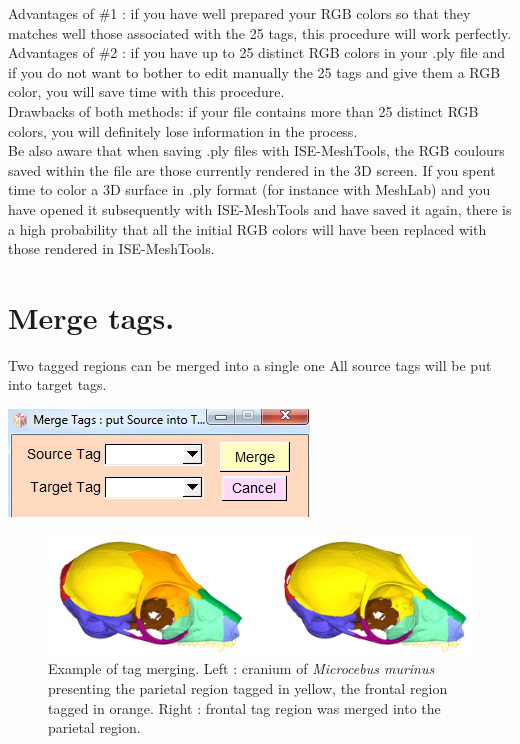Advantages of \#1 : if you have well prepared your RGB colors so that they matches well those associated with the 25 tags, this procedure will work perfectly.\\
Advantages of \#2 : if you have up to 25 distinct RGB colors in your .ply file and if you do not want to bother to edit manually the 25 tags and give them a RGB color, you will save time with this procedure. 
\\Drawbacks of both methods: if your file contains more than 25 distinct RGB colors, you will definitely lose information in the process.
\\Be also aware that when saving .ply files with ISE-MeshTools, the RGB coulours saved within the file are those currently rendered in the 3D screen. If you spent time to color a 3D surface in .ply format (for instance with MeshLab) and you have opened it subsequently with ISE-MeshTools and have saved it again, there is a high probability that all the initial RGB colors will have been replaced with those rendered in ISE-MeshTools.


\section{Merge tags.}
\noindent
\begin{minipage}{0.5\textwidth}
Two tagged regions can be merged into a single one
All source tags will be put into target tags.
\end{minipage}    
\begin{minipage}{0.5\textwidth}\centering
  \includegraphics[scale=0.5]{images/Tags/Merge_tags.png}
 \end{minipage} 
\noindent
\begin{figure}
  \centering
  \includegraphics[scale=0.25]{images/Tags/Merge.png} 
	\caption{Example of tag merging. Left : cranium of \textit{Microcebus murinus} presenting the parietal region
tagged in yellow, the frontal region tagged in orange. Right : frontal tag region was merged into
the parietal region.}
\label{merge_tags}
 
\end{figure}



